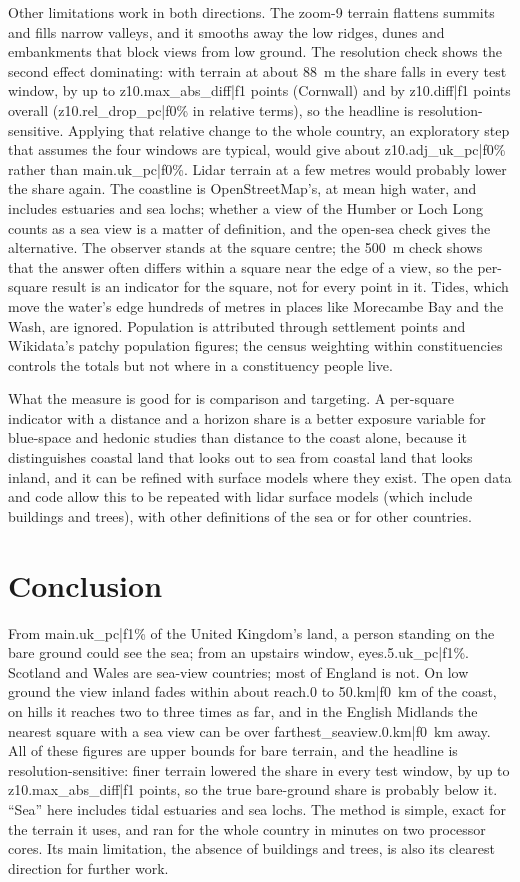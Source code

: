 Other limitations work in both directions. The zoom-9 terrain flattens summits and fills narrow valleys, and it smooths away the low ridges, dunes and embankments that block views from low ground. The resolution check shows the second effect dominating: with terrain at about 88~m the share falls in every test window, by up to {{z10.max_abs_diff|f1}} points (Cornwall) and by {{z10.diff|f1}} points overall ({{z10.rel_drop_pc|f0}}\% in relative terms), so the headline is resolution-sensitive. Applying that relative change to the whole country, an exploratory step that assumes the four windows are typical, would give about {{z10.adj_uk_pc|f0}}\% rather than {{main.uk_pc|f0}}\%. Lidar terrain at a few metres would probably lower the share again. The coastline is OpenStreetMap's, at mean high water, and includes estuaries and sea lochs; whether a view of the Humber or Loch Long counts as a sea view is a matter of definition, and the open-sea check gives the alternative. The observer stands at the square centre; the 500~m check shows that the answer often differs within a square near the edge of a view, so the per-square result is an indicator for the square, not for every point in it. Tides, which move the water's edge hundreds of metres in places like Morecambe Bay and the Wash, are ignored. Population is attributed through settlement points and Wikidata's patchy population figures; the census weighting within constituencies controls the totals but not where in a constituency people live.

What the measure is good for is comparison and targeting. A per-square indicator with a distance and a horizon share is a better exposure variable for blue-space and hedonic studies than distance to the coast alone, because it distinguishes coastal land that looks out to sea from coastal land that looks inland, and it can be refined with surface models where they exist. The open data and code allow this to be repeated with lidar surface models (which include buildings and trees), with other definitions of the sea or for other countries.

\section{Conclusion}\label{sec:conc}
From {{main.uk_pc|f1}}\% of the United Kingdom's land, a person standing on the bare ground could see the sea; from an upstairs window, {{eyes.5.uk_pc|f1}}\%. Scotland and Wales are sea-view countries; most of England is not. On low ground the view inland fades within about {{reach.0 to 50.km|f0}}~km of the coast, on hills it reaches two to three times as far, and in the English Midlands the nearest square with a sea view can be over {{farthest_seaview.0.km|f0}}~km away. All of these figures are upper bounds for bare terrain, and the headline is resolution-sensitive: finer terrain lowered the share in every test window, by up to {{z10.max_abs_diff|f1}} points, so the true bare-ground share is probably below it. ``Sea'' here includes tidal estuaries and sea lochs. The method is simple, exact for the terrain it uses, and ran for the whole country in minutes on two processor cores. Its main limitation, the absence of buildings and trees, is also its clearest direction for further work.

